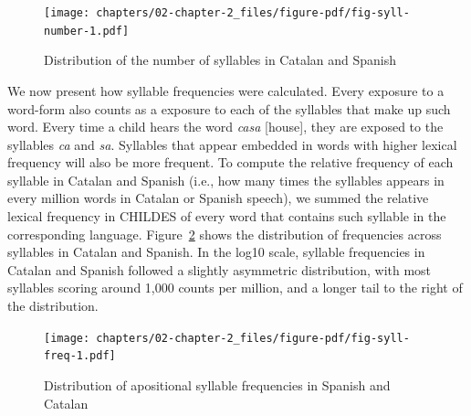 \documentclass[
  12pt,
  b5paperpaper,
  twoside]{scrreprt}
\begin{document}
\begin{figure}

{\centering \texttt{[image: chapters/02-chapter-2\_files/figure-pdf/fig-syll-number-1.pdf]}

}

\caption{\label{fig-syll-number}Distribution of the number of syllables
in Catalan and Spanish}

\end{figure}

We now present how syllable frequencies were calculated. Every exposure
to a word-form also counts as a exposure to each of the syllables that
make up such word. Every time a child hears the word \emph{casa}
{[}house{]}, they are exposed to the syllables \emph{ca} and \emph{sa}.
Syllables that appear embedded in words with higher lexical frequency
will also be more frequent. To compute the relative frequency of each
syllable in Catalan and Spanish (i.e., how many times the syllables
appears in every million words in Catalan or Spanish speech), we summed
the relative lexical frequency in CHILDES of every word that contains
such syllable in the corresponding language. Figure~\ref{fig-syll-freq}
shows the distribution of frequencies across syllables in Catalan and
Spanish. In the log10 scale, syllable frequencies in Catalan and Spanish
followed a slightly asymmetric distribution, with most syllables scoring
around 1,000 counts per million, and a longer tail to the right of the
distribution.

\begin{figure}

{\centering \texttt{[image: chapters/02-chapter-2\_files/figure-pdf/fig-syll-freq-1.pdf]}

}

\caption{\label{fig-syll-freq}Distribution of apositional syllable
frequencies in Spanish and Catalan}

\end{figure}
\end{document}
